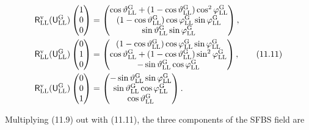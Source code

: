 \documentclass[
  10pt,
]{article}
\begin{document}
\[\begin{aligned}\mathsf R^{\rm v}_{\rm LL}(\mathsf U^{\rm G}_{\rm LL})\begin{pmatrix}1\\0\\0\end{pmatrix}&=\begin{pmatrix}\cos\vartheta^{\rm G}_{\rm LL}+(1-\cos\vartheta^{\rm G}_{\rm LL})\cos^2\varphi^{\rm G}_{\rm LL}\\(1-\cos\vartheta^{\rm G}_{\rm LL})\cos\varphi^{\rm G}_{\rm LL}\sin\varphi^{\rm G}_{\rm LL}\\\sin\vartheta^{\rm G}_{\rm LL}\sin\varphi^{\rm G}_{\rm LL}\end{pmatrix},\\\mathsf R^{\rm v}_{\rm LL}(\mathsf U^{\rm G}_{\rm LL})\begin{pmatrix}0\\1\\0\end{pmatrix}&=\begin{pmatrix}(1-\cos\vartheta^{\rm G}_{\rm LL})\cos\varphi^{\rm G}_{\rm LL}\sin\varphi^{\rm G}_{\rm LL}\\\cos\vartheta^{\rm G}_{\rm LL}+(1-\cos\vartheta^{\rm G}_{\rm LL})\sin^2\varphi^{\rm G}_{\rm LL}\\-\sin\vartheta^{\rm G}_{\rm LL}\cos\varphi^{\rm G}_{\rm LL}\end{pmatrix},\\\mathsf R^{\rm v}_{\rm LL}(\mathsf U^{\rm G}_{\rm LL})\begin{pmatrix}0\\0\\1\end{pmatrix}&=\begin{pmatrix}-\sin\vartheta^{\rm G}_{\rm LL}\sin\varphi^{\rm G}_{\rm LL}\\\sin\vartheta^{\rm G}_{\rm LL}\cos\varphi^{\rm G}_{\rm LL}\\\cos\vartheta^{\rm G}_{\rm LL}\end{pmatrix}.\end{aligned}\tag{11.11}\]

Multiplying (11.9) out with (11.11), the three components of the SFBS
field are
\end{document}
